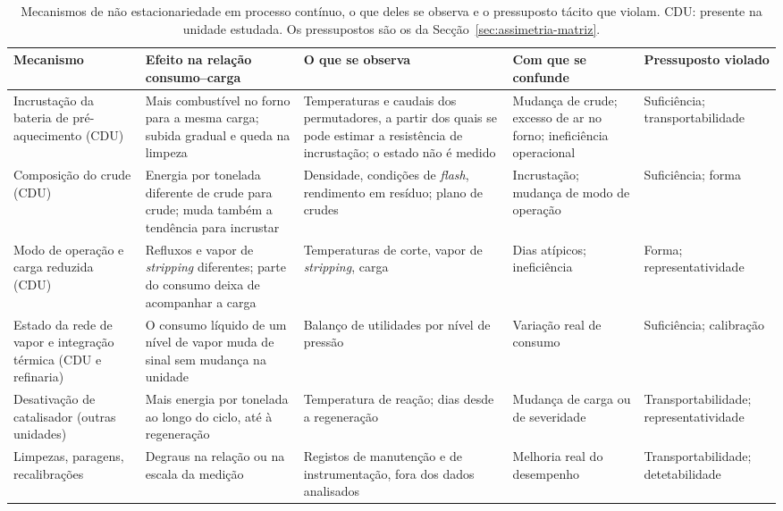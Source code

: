 \begin{table}[htbp]
  \centering\footnotesize
  \caption[Mecanismos de processo contínuo e pressupostos que violam]{Mecanismos
  de não estacionariedade em processo contínuo, o que deles se observa e o
  pressuposto tácito que violam. CDU: presente na unidade estudada. Os
  pressupostos são os da Secção~\ref{sec:assimetria-matriz}.}
  \label{tab:mecanismos-pressupostos}
  \begin{tabularx}{\textwidth}{@{}>{\raggedright\arraybackslash}p{2.3cm} >{\raggedright\arraybackslash}X >{\raggedright\arraybackslash}X >{\raggedright\arraybackslash}X >{\raggedright\arraybackslash}p{2.1cm}@{}}
    \toprule
    \textbf{Mecanismo} & \textbf{Efeito na relação consumo--carga} & \textbf{O que se observa} & \textbf{Com que se confunde} & \textbf{Pressuposto violado} \\
    \midrule
    Incrustação da bateria de pré-aquecimento (CDU) & Mais combustível no forno para a mesma carga; subida gradual e queda na limpeza & Temperaturas e caudais dos permutadores, a partir dos quais se pode estimar a resistência de incrustação; o estado não é medido & Mudança de crude; excesso de ar no forno; ineficiência operacional & Suficiência; transportabilidade \\
    \addlinespace
    Composição do crude (CDU) & Energia por tonelada diferente de crude para crude; muda também a tendência para incrustar & Densidade, condições de \emph{flash}, rendimento em resíduo; plano de crudes & Incrustação; mudança de modo de operação & Suficiência; forma \\
    \addlinespace
    Modo de operação e carga reduzida (CDU) & Refluxos e vapor de \emph{stripping} diferentes; parte do consumo deixa de acompanhar a carga & Temperaturas de corte, vapor de \emph{stripping}, carga & Dias atípicos; ineficiência & Forma; representatividade \\
    \addlinespace
    Estado da rede de vapor e integração térmica (CDU e refinaria) & O consumo líquido de um nível de vapor muda de sinal sem mudança na unidade & Balanço de utilidades por nível de pressão & Variação real de consumo & Suficiência; calibração \\
    \addlinespace
    Desativação de catalisador (outras unidades) & Mais energia por tonelada ao longo do ciclo, até à regeneração & Temperatura de reação; dias desde a regeneração & Mudança de carga ou de severidade & Transportabilidade; representatividade \\
    \addlinespace
    Limpezas, paragens, recalibrações & Degraus na relação ou na escala da medição & Registos de manutenção e de instrumentação, fora dos dados analisados & Melhoria real do desempenho & Transportabilidade; detetabilidade \\
    \bottomrule
  \end{tabularx}
\end{table}

